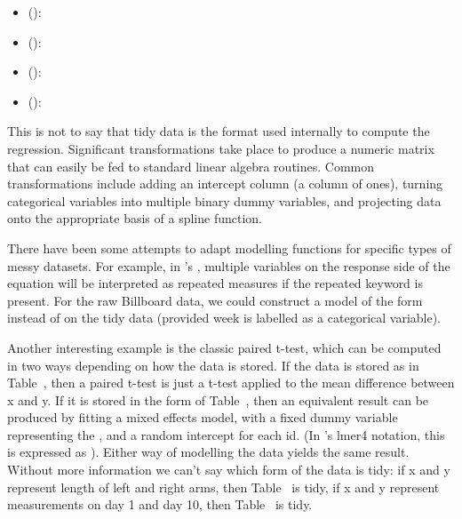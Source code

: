 \documentclass[article]{jss}
\begin{document}
\begin{itemize}

  \item {} (): 

  \item {} (): 

  \item {} (): 

  \item {} (): 


\end{itemize}

This is not to say that tidy data is the format used internally to compute the regression. Significant transformations take place to produce a numeric matrix that can easily be fed to standard linear algebra routines. Common transformations include adding an intercept column (a column of ones), turning categorical variables into multiple binary dummy variables, and projecting data onto the appropriate basis of a spline function.


There have been some attempts to adapt modelling functions for specific types of messy datasets. For example, in 's , multiple variables on the response side of the equation will be interpreted as repeated measures if the {\sc repeated} keyword is present. For the raw Billboard data, we could construct a model of the form  instead of  on the tidy data (provided week is labelled as a categorical variable). 

Another interesting example is the classic paired t-test, which can be computed in two ways depending on how the data is stored. If the data is stored as in Table~, then a paired t-test is just a t-test applied to the mean difference between x and y. If it is stored in the form of Table~, then an equivalent result can be produced by fitting a mixed effects model, with a fixed dummy variable representing the , and a random intercept for each id. (In 's lmer4 notation, this is expressed as ). Either way of modelling the data yields the same result. Without more information we can't say which form of the data is tidy: if x and y represent length of left and right arms, then Table~ is tidy, if x and y represent measurements on day 1 and day 10, then Table~ is tidy.
\end{document}
